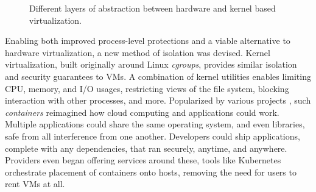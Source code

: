 
\begin{figure}
  \caption{Different layers of abstraction between hardware and kernel based virtualization.}
  \label{fig:docker-vs-vms}
\end{figure}

Enabling both improved process-level protections and a viable alternative to hardware virtualization, a new method of isolation was devised.
Kernel virtualization, built originally around Linux \textit{cgroups}, provides similar isolation and security guarantees to VMs.
A combination of kernel utilities enables limiting CPU, memory, and I/O usages, restricting views of the file system, blocking interaction with other processes, and more.
Popularized by various projects \cite{oci,docker-main}, such \textit{containers} reimagined how cloud computing and applications could work.
Multiple applications could share the same operating system, and even libraries, safe from all interference from one another.
Developers could ship applications, complete with any dependencies, that ran securely, anytime, and anywhere.
Providers even began offering services around these, tools like Kubernetes \cite{kubernetes} orchestrate placement of containers onto hosts, removing the need for users to rent VMs at all.
